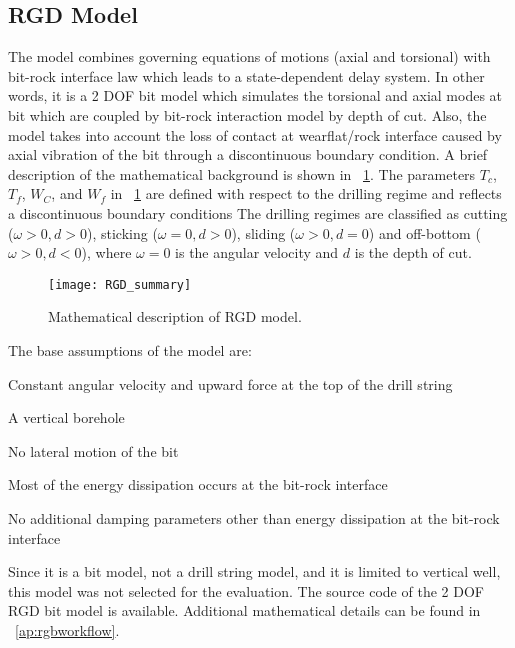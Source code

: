 \subsection{RGD Model}
The model combines governing equations of motions (axial and torsional) with bit-rock interface law which leads to a state-dependent delay system. In other words, it is a 2 DOF bit model which simulates the torsional and axial modes at bit which are coupled by bit-rock interaction model by depth of cut. Also, the model takes into account the loss of contact at wearflat/rock interface caused by axial vibration of the bit through a discontinuous boundary condition. A brief description of the mathematical background is shown in \figurename~\ref{figure_RGD_Summary}. The parameters $T_c$, $T_f$, $W_C$, and $W_f$ in \figurename~\ref{figure_RGD_Summary} are defined with respect to the drilling regime and reflects a discontinuous boundary conditions The drilling regimes are classified as cutting ($\omega>0, d>0$), sticking ($\omega=0, d>0$), sliding ($\omega>0, d=0$) and off-bottom ($\omega>0, d<0$), where $\omega=0$ is the angular velocity and $d$ is the depth of cut.
\begin{figure}
  \centering
  \texttt{[image: RGD\_summary]}
  \caption[Mathematical description of RGD model]{Mathematical description of RGD model.}\label{figure_RGD_Summary}
\end{figure}
The base assumptions of the model are:
\begin{bulletedlist}
	\item Constant angular velocity and upward force at the top of the drill string
	\item A vertical borehole
	\item No lateral motion of the bit
	\item Most of the energy dissipation occurs at the bit-rock interface
    \item No additional damping parameters other than energy dissipation at the bit-rock interface
\end{bulletedlist}

Since it is a bit model, not a drill string model, and it is limited to vertical well, this model was not selected for the evaluation. The source code of the 2 DOF RGD bit model is available.  Additional mathematical details can be found in \appendixname~\ref{ap:rgbworkflow}.

